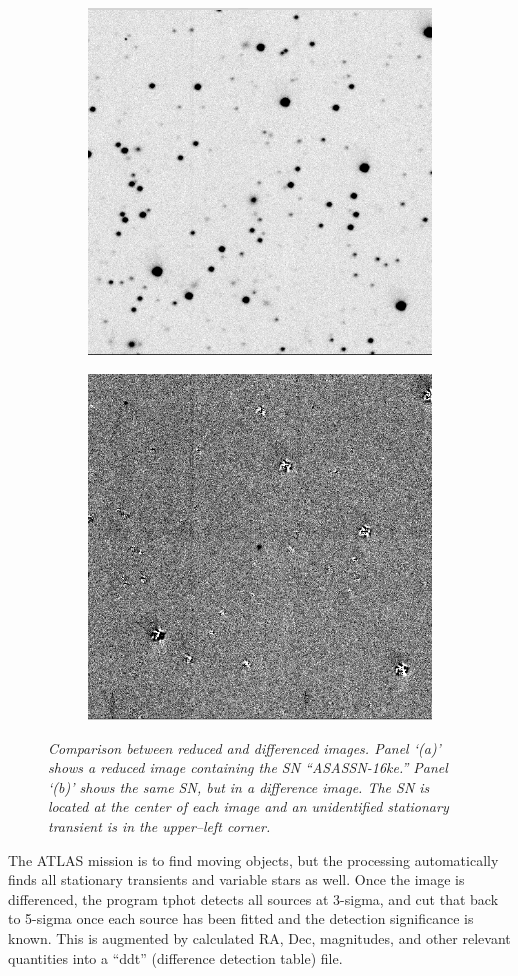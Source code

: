 \documentclass[aps,prb,twocolumn,superscriptaddress]{revtex4-1}
\begin{document}
\begin{figure}
  \centering
  \begin{subfigure}{.5\textwidth}
    \centering
    \includegraphics[width=0.5\linewidth]{figures/compare/red_ASASSN-16ke_with_other.png}
    \caption{\it \small{ }}
    \label{fig:red16ke}
  \end{subfigure}%
  \begin{subfigure}{.5\textwidth}
    \centering
      \includegraphics[width=0.5\linewidth]{figures/compare/diff_ASASSN-16ke_with_other.png}
    \caption{\it \small{ }}
    \label{fig:diff16ke}
  \end{subfigure}
  \caption{\it \small{Comparison between reduced and differenced images.  Panel `(a)' shows a reduced image containing the SN ``ASASSN-16ke.''  Panel `(b)' shows the same SN, but in a difference image.  The SN is located at the center of each image and an unidentified stationary transient is in the upper--left corner.}}
  \label{fig:compreddiff}
\end{figure}

The ATLAS mission is to find moving objects, but the processing
automatically finds all stationary transients and variable stars as
well.  Once the image is differenced, the program tphot detects all
sources at 3-sigma, and cut that back to 5-sigma once each source
has been fitted and the detection significance is known.  
This is augmented by calculated RA, Dec, magnitudes, and other relevant
quantities into a ``ddt'' (difference detection table) file.
\end{document}
